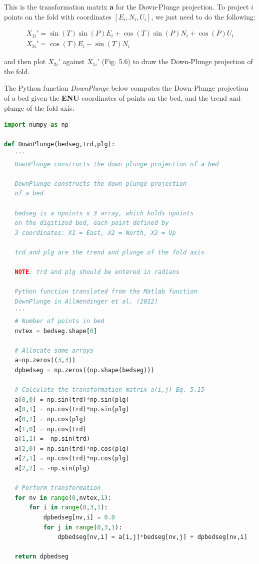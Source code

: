 \documentclass[a4paper , 12pt]{book}
\begin{document}
This is the transformation matrix \textbf{a} for the Down-Plunge projection. To project $i$ points on the fold with coordinates $[E_i,N_i,U_i]$, we just need to do the following:

\begin{equation}
    \begin{split}
        X_{1i}'=\sin(T)\sin(P)E_i+\cos(T)\sin(P)N_i+\cos(P)U_i \\
        X_{2i}'=\cos(T)E_i-\sin(T)N_i  \hspace{60pt}
    \end{split}
\end{equation}

and then plot $X_{2i}'$ against $X_{1i}'$ (Fig. 5.6) to draw the Down-Plunge projection of the fold.

The Python function \textit{DownPlunge} below computes the Down-Plunge projection of a bed given the \textbf{ENU} coordinates of points on the bed, and the trend and plunge of the fold axis:

\begin{lstlisting}[language=Python, frame=single]
import numpy as np

def DownPlunge(bedseg,trd,plg):
   '''
   DownPlunge constructs the down plunge projection of a bed

   DownPlunge constructs the down plunge projection
   of a bed

   bedseg is a npoints x 3 array, which holds npoints 
   on the digitized bed, each point defined by
   3 coordinates: X1 = East, X2 = North, X3 = Up

   trd and plg are the trend and plunge of the fold axis

   NOTE: trd and plg should be entered in radians

   Python function translated from the Matlab function 
   DownPlunge in Allmendinger et al. (2012)
   '''
   # Number of points in bed
   nvtex = bedseg.shape[0]

   # Allocate some arrays
   a=np.zeros((3,3))
   dpbedseg = np.zeros((np.shape(bedseg)))
   
   # Calculate the transformation matrix a(i,j) Eq. 5.15
   a[0,0] = np.sin(trd)*np.sin(plg)
   a[0,1] = np.cos(trd)*np.sin(plg)
   a[0,2] = np.cos(plg)
   a[1,0] = np.cos(trd)
   a[1,1] = -np.sin(trd)
   a[2,0] = np.sin(trd)*np.cos(plg)
   a[2,1] = np.cos(trd)*np.cos(plg)
   a[2,2] = -np.sin(plg)
    
   # Perform transformation
   for nv in range(0,nvtex,1):
       for i in range(0,3,1):
           dpbedseg[nv,i] = 0.0
           for j in range(0,3,1):
               dpbedseg[nv,i] = a[i,j]*bedseg[nv,j] + dpbedseg[nv,i]
                
   return dpbedseg
\end{lstlisting}
\end{document}
